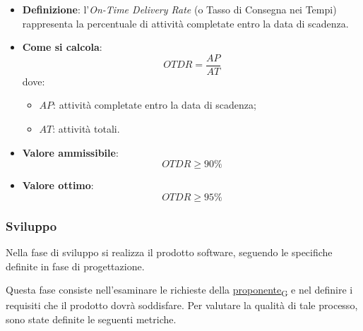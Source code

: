 \begin{itemize}
	\item \textbf{Definizione}: l'\textit{On-Time Delivery Rate} (o Tasso di Consegna nei Tempi) rappresenta la percentuale di attività completate entro la data di scadenza.
	\item \textbf{Come si calcola}: \begin{equation*}OTDR = \frac{AP}{AT}\end{equation*} dove:
		\begin{itemize}
			\item $AP$: attività completate entro la data di scadenza;
			\item $AT$: attività totali.
		\end{itemize}
	\item \textbf{Valore ammissibile}: \begin{equation*}OTDR \geq 90\%\end{equation*}
	\item \textbf{Valore ottimo}: \begin{equation*}OTDR \geq 95\%\end{equation*}
\end{itemize}



\subsubsection{Sviluppo}
Nella fase di sviluppo si realizza il prodotto software, seguendo le specifiche definite in fase di progettazione.

Questa fase consiste nell'esaminare le richieste della \href{https://7last.github.io/docs/rtb/documentazione-interna/glossario\#proponente}{proponente\textsubscript{G}} e nel definire i requisiti che il prodotto dovrà soddisfare. Per valutare la qualità di tale processo, sono state definite le seguenti metriche.

